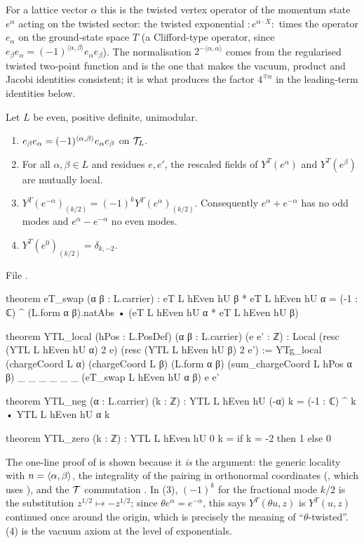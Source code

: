 \begin{physics}
For a lattice vector $\alpha$ this is the twisted vertex operator of the momentum state $e^\alpha$ acting on the twisted sector: the twisted exponential $:\!e^{\alpha\cdot X}\!:$ times the operator $e_\alpha$ on the ground-state space $T$ (a Clifford-type operator, since $e_\beta e_\alpha=(-1)^{\langle\alpha,\beta\rangle}e_\alpha e_\beta$). The normalisation $2^{-\langle\alpha,\alpha\rangle}$ comes from the regularised twisted two-point function and is the one that makes the vacuum, product and Jacobi identities consistent; it is what produces the factor $4^{\mp n}$ in the leading-term identities below.
\end{physics}

\begin{theorem}\label{ch08:thm:YTL}
Let $L$ be even, positive definite, unimodular.
\begin{enumerate}
\item $e_\beta e_\alpha=(-1)^{\langle \alpha,\beta\rangle}e_\alpha e_\beta$ on $\mathcal{T}_L$.
\item For all $\alpha,\beta\in L$ and residues $e,e'$, the rescaled fields of $Y^T(e^\alpha)$ and
  $Y^T(e^\beta)$ are mutually local.
\item $Y^T(e^{-\alpha})_{(k/2)}=(-1)^kY^T(e^\alpha)_{(k/2)}$.  Consequently
  $e^\alpha+e^{-\alpha}$ has no odd modes and $e^\alpha-e^{-\alpha}$ no even modes.
\item $Y^T(e^0)_{(k/2)}=\delta_{k,-2}$.
\end{enumerate}
\end{theorem}
\noindent File .
\begin{leancode}
theorem eT_swap (α β : L.carrier) :
    eT L hEven hU β * eT L hEven hU α
      = (-1 : ℂ) ^ (L.form α β).natAbs • (eT L hEven hU α * eT L hEven hU β)

theorem YTL_local (hPos : L.PosDef) (α β : L.carrier) (e e' : ℤ) :
    Local (resc (YTL L hEven hU α) 2 e) (resc (YTL L hEven hU β) 2 e') :=
  YTg_local (chargeCoord L α) (chargeCoord L β) (L.form α β) (sum_chargeCoord L hPos α β) _ _ _ _
    _ _ (eT_swap L hEven hU α β) e e'

theorem YTL_neg (α : L.carrier) (k : ℤ) :
    YTL L hEven hU (-α) k = (-1 : ℂ) ^ k • YTL L hEven hU α k

theorem YTL_zero (k : ℤ) : YTL L hEven hU 0 k = if k = -2 then 1 else 0
\end{leancode}
\begin{dictionary}
The one-line proof of  is shown because it \emph{is} the argument: the generic
locality with $n=\langle \alpha,\beta\rangle$, the integrality of the pairing in orthonormal coordinates
(, which uses ), and the $\mathcal{T}$ commutation .
In (3), $(-1)^k$ for the fractional mode $k/2$ is the substitution $z^{1/2}\mapsto -z^{1/2}$; since
$\theta e^\alpha=e^{-\alpha}$, this says $Y^T(\theta u,z)$ is $Y^T(u,z)$ continued once around the
origin, which is precisely the meaning of ``$\theta$-twisted''.  (4) is the vacuum axiom at the
level of exponentials.
\end{dictionary}

